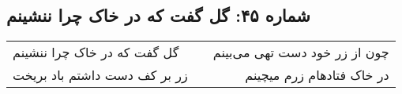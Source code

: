 \begin{center}
\section*{شماره ۴۵: گل گفت که در خاک چرا ننشینم}
\label{sec:045}
\begin{longtable}{l p{0.5cm} r}
گل گفت که در خاک چرا ننشینم
&&
چون از زر خود دست تهی می‌بینم
\\
زر بر کف دست داشتم باد بریخت
&&
در خاک فتادهام زرم میچینم
\\
\end{longtable}
\end{center}
